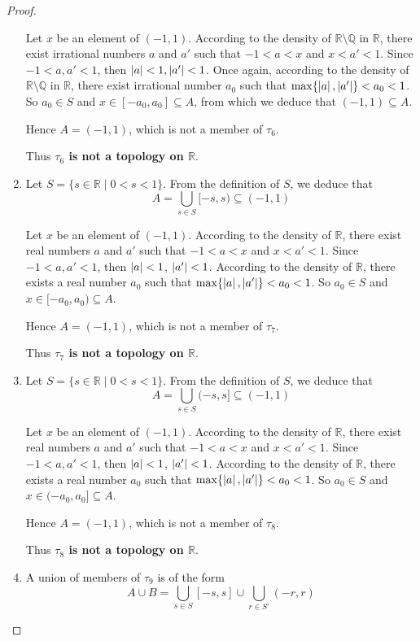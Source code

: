 \begin{proof}
\begin{enumerate}[label={(\roman*)}]
		      Let $x$ be an element of $(-1, 1)$. According to the density of $\mathbb{R}\setminus\mathbb{Q}$ in $\mathbb{R}$, there exist irrational numbers $a$ and $a'$ such that $-1 < a < x$ and $x < a' < 1$. Since $-1 < a, a' < 1$, then $\left\vert{a}\right\vert < 1, \left\vert{a'}\right\vert < 1$. Once again, according to the density of $\mathbb{R}\setminus\mathbb{Q}$ in $\mathbb{R}$, there exist irrational number $a_{0}$ such that $\max\{ \left\vert{a}\right\vert, \left\vert{a'}\right\vert \} < a_{0} < 1$. So $a_{0}\in S$ and $x\in [-a_{0}, a_{0}]\subseteq A$, from which we deduce that $(-1, 1)\subseteq A$.

		      Hence $A = (-1, 1)$, which is not a member of $\tau_{6}$.

		      Thus \textbf{$\tau_{6}$ is not a topology on $\mathbb{R}$}.
		\item Let $S = \{ s\in\mathbb{R} \mid 0 < s < 1 \}$. From the definition of $S$, we deduce that
		      \[
			      A = \bigcup_{s\in S} [-s, s) \subseteq (-1, 1)
		      \]

		      Let $x$ be an element of $(-1, 1)$. According to the density of $\mathbb{R}$, there exist real numbers $a$ and $a'$ such that $-1 < a < x$ and $x < a' < 1$. Since $-1 < a, a' < 1$, then $\left\vert{a}\right\vert < 1$, $\left\vert{a'}\right\vert < 1$. According to the density of $\mathbb{R}$, there exists a real number $a_{0}$ such that $\max\{ \left\vert{a}\right\vert, \left\vert{a'}\right\vert \} < a_{0} < 1$. So $a_{0}\in S$ and $x\in [-a_{0}, a_{0})\subseteq A$.

		      Hence $A = (-1, 1)$, which is not a member of $\tau_{7}$.

		      Thus \textbf{$\tau_{7}$ is not a topology on $\mathbb{R}$}.
		\item Let $S = \{ s\in\mathbb{R} \mid 0 < s < 1 \}$. From the definition of $S$, we deduce that
		      \[
			      A = \bigcup_{s\in S} (-s, s] \subseteq (-1, 1)
		      \]

		      Let $x$ be an element of $(-1, 1)$. According to the density of $\mathbb{R}$, there exist real numbers $a$ and $a'$ such that $-1 < a < x$ and $x < a' < 1$. Since $-1 < a, a' < 1$, then $\left\vert{a}\right\vert < 1$, $\left\vert{a'}\right\vert < 1$. According to the density of $\mathbb{R}$, there exists a real number $a_{0}$ such that $\max\{ \left\vert{a}\right\vert, \left\vert{a'}\right\vert \} < a_{0} < 1$. So $a_{0}\in S$ and $x\in (-a_{0}, a_{0}]\subseteq A$.

		      Hence $A = (-1, 1)$, which is not a member of $\tau_{8}$.

		      Thus \textbf{$\tau_{8}$ is not a topology on $\mathbb{R}$}.
		\item A union of members of $\tau_{9}$ is of the form
		      \[
			      A\cup B = \bigcup_{s\in S} [-s, s] \cup \bigcup_{r\in S'} (-r, r)
		      \]


\end{enumerate}
\end{proof}
